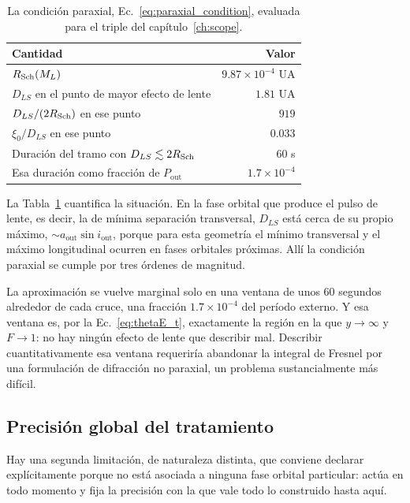 \documentclass[11pt,a4paper,openany]{book}
\newcommand{\aout}{a_{\mathrm{out}}}
\begin{document}
\begin{table}[htbp]
\centering
\small
\begin{tabular}{lr}
\toprule
Cantidad & Valor \\
\midrule
$R_{\rm Sch}(M_L)$ & $9.87\times10^{-4}$ UA \\
$D_{LS}$ en el punto de mayor efecto de lente & $1.81$ UA \\
$D_{LS}/(2R_{\rm Sch})$ en ese punto & $919$ \\
$\xi_0/D_{LS}$ en ese punto & $0.033$ \\
Duraci\'on del tramo con $D_{LS}\lesssim2R_{\rm Sch}$ & $60$ s \\
Esa duraci\'on como fracci\'on de $P_\mathrm{out}$ & $1.7\times10^{-4}$ \\
\bottomrule
\end{tabular}
\caption{La condici\'on paraxial, Ec.~\eqref{eq:paraxial_condition}, evaluada
para el triple del cap\'itulo~\ref{ch:scope}.}
\label{tab:paraxial}
\end{table}

La Tabla~\ref{tab:paraxial} cuantifica la situaci\'on. En la fase orbital que
produce el pulso de lente, es decir, la de m\'inima separaci\'on transversal,
$D_{LS}$ est\'a cerca de su propio m\'aximo, $\sim\aout\sin i_\mathrm{out}$,
porque para esta geometr\'ia el m\'inimo transversal y el m\'aximo longitudinal
ocurren en fases orbitales pr\'oximas. All\'i la condici\'on
paraxial se cumple por tres \'ordenes de magnitud.

La aproximaci\'on se vuelve marginal solo en una ventana de unos $60$ segundos
alrededor de cada cruce, una fracci\'on $1.7\times10^{-4}$ del per\'iodo
externo. Y esa ventana es, por la Ec.~\eqref{eq:thetaE_t}, exactamente la
regi\'on en la que $y\to\infty$ y $F\to1$: no hay ning\'un efecto de lente que
describir mal. Describir cuantitativamente esa ventana requerir\'ia abandonar
la integral de Fresnel por una formulaci\'on de difracci\'on no paraxial, un
problema sustancialmente m\'as dif\'icil.

\subsection*{Precisi\'on global del tratamiento}

Hay una segunda limitaci\'on, de naturaleza distinta, que conviene declarar
expl\'icitamente porque no est\'a asociada a ninguna fase orbital particular:
act\'ua en todo momento y fija la precisi\'on con la que vale todo lo
construido hasta aqu\'i.
\end{document}

